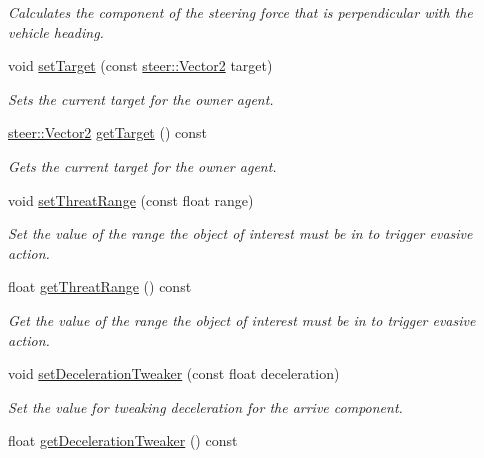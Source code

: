 \begin{DoxyCompactItemize}
\begin{DoxyCompactList}\small\item\em Calculates the component of the steering force that is perpendicular with the vehicle heading. \end{DoxyCompactList}\item 
void \hyperlink{classsteer_1_1_agent_abc82085231bd505ef3b00618087fd03a}{set\-Target} (const \hyperlink{structsteer_1_1_vector2}{steer\-::\-Vector2} target)
\begin{DoxyCompactList}\small\item\em Sets the current target for the owner agent. \end{DoxyCompactList}\item 
\hypertarget{classsteer_1_1_agent_adb459be5cce83fece0968c1e12ff09ce}{\hyperlink{structsteer_1_1_vector2}{steer\-::\-Vector2} \hyperlink{classsteer_1_1_agent_adb459be5cce83fece0968c1e12ff09ce}{get\-Target} () const }\label{classsteer_1_1_agent_adb459be5cce83fece0968c1e12ff09ce}

\begin{DoxyCompactList}\small\item\em Gets the current target for the owner agent. \end{DoxyCompactList}\item 
void \hyperlink{classsteer_1_1_agent_ad120d6c1da96904a6425a0a51ad5db3b}{set\-Threat\-Range} (const float range)
\begin{DoxyCompactList}\small\item\em Set the value of the range the object of interest must be in to trigger evasive action. \end{DoxyCompactList}\item 
\hypertarget{classsteer_1_1_agent_a5833ecd792564fde4548e852e7d08663}{float \hyperlink{classsteer_1_1_agent_a5833ecd792564fde4548e852e7d08663}{get\-Threat\-Range} () const }\label{classsteer_1_1_agent_a5833ecd792564fde4548e852e7d08663}

\begin{DoxyCompactList}\small\item\em Get the value of the range the object of interest must be in to trigger evasive action. \end{DoxyCompactList}\item 
void \hyperlink{classsteer_1_1_agent_af7d3e91b9f8367345f04d39b405b6b2d}{set\-Deceleration\-Tweaker} (const float deceleration)
\begin{DoxyCompactList}\small\item\em Set the value for tweaking deceleration for the arrive component. \end{DoxyCompactList}\item 
\hypertarget{classsteer_1_1_agent_ae8f6ad68e363301365de2b32584eabca}{float \hyperlink{classsteer_1_1_agent_ae8f6ad68e363301365de2b32584eabca}{get\-Deceleration\-Tweaker} () const }\label{classsteer_1_1_agent_ae8f6ad68e363301365de2b32584eabca}


\end{DoxyCompactItemize}
